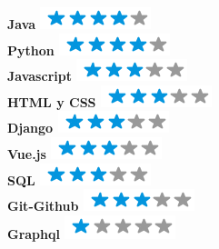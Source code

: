 \documentclass[american]{cv-class}
\begin{document}
\begin{aside}
\begin{small}
    \textbf{{Java \hspace{1.57cm}    } {\raisebox{-0.35ex} {\includegraphics[scale=0.5]{img/stars/4stars.png}}}}
    \\
     \textbf{{Python \hspace{1.18cm}    } {\raisebox{-0.35ex} {\includegraphics[scale=0.5]{img/stars/4stars.png}}}}
    \\
    \textbf{{Javascript \hspace{0.7cm}    } {\raisebox{-0.35ex} {\includegraphics[scale=0.66]{img/stars/3stars.png}}}}
    \\
    \textbf{{HTML y CSS \hspace{0.38cm}    } {\raisebox{-0.35ex} {\includegraphics[scale=0.66]{img/stars/3stars.png}}}}
    \\
    \textbf{{Django \hspace{1.2cm}    } {\raisebox{-0.35ex} {\includegraphics[scale=0.67]{img/stars/3stars.png}}}}
    \\
    \textbf{{Vue.js \hspace{1.35cm}    } {\raisebox{-0.35ex} {\includegraphics[scale=0.67]{img/stars/3stars.png}}}}
    \\
     \textbf{{SQL \hspace{1.6cm}    } {\raisebox{-0.35ex} {\includegraphics[scale=0.67]{img/stars/3stars.png}}}}
    \\
    \textbf{{Git-Github \hspace{0.7cm}    } {\raisebox{-0.35ex} {\includegraphics[scale=0.67]{img/stars/3stars.png}}}}
    \\
    \textbf{{Graphql \hspace{1.05cm}    } {\raisebox{-0.35ex} {\includegraphics[scale=0.5]{img/stars/1stars.png}}}}
     
    \end{small}
\end{aside}
\end{document}
